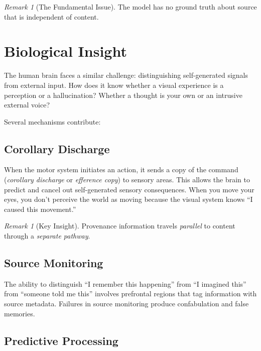 \documentclass[11pt,a4paper]{article}
\theoremstyle{plain}
\theoremstyle{definition}
\theoremstyle{remark}
\newtheorem{remark}[theorem]{Remark}
\begin{document}
\begin{remark}[The Fundamental Issue]
The model has no ground truth about source that is independent of content.
\end{remark}

\section{Biological Insight}

The human brain faces a similar challenge: distinguishing self-generated signals from external input. How does it know whether a visual experience is a perception or a hallucination? Whether a thought is your own or an intrusive external voice?

Several mechanisms contribute:

\subsection{Corollary Discharge}

When the motor system initiates an action, it sends a copy of the command (\emph{corollary discharge} or \emph{efference copy}) to sensory areas. This allows the brain to predict and cancel out self-generated sensory consequences. When you move your eyes, you don't perceive the world as moving because the visual system knows ``I caused this movement.''

\begin{remark}[Key Insight]
Provenance information travels \emph{parallel} to content through a \emph{separate pathway}.
\end{remark}

\subsection{Source Monitoring}

The ability to distinguish ``I remember this happening'' from ``I imagined this'' from ``someone told me this'' involves prefrontal regions that tag information with source metadata. Failures in source monitoring produce confabulation and false memories.

\subsection{Predictive Processing}
\end{document}
